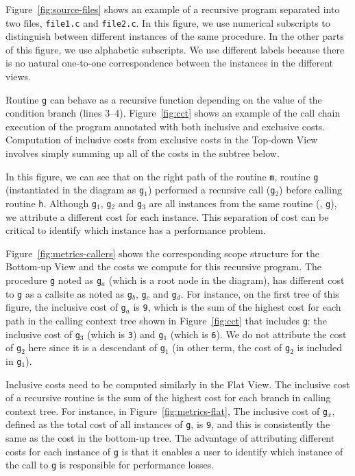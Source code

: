 Figure~\ref{fig:source-files} shows an example of a recursive program separated into two files, \texttt{file1.c} and \texttt{file2.c}.
In this figure, we use numerical subscripts to distinguish between different instances of the same procedure.
In the other parts of this figure, we use alphabetic subscripts.
We use different labels because there is no natural one-to-one correspondence between the instances in the different views.

Routine \texttt{g} can behave as a recursive function depending on the value of the condition branch (lines 3--4).
Figure~\ref{fig:cct} shows an example of the call chain execution of the program annotated with both inclusive and exclusive costs.
Computation of inclusive costs from exclusive costs in the Top-down View involves simply summing up all of the costs in the subtree below.

In this figure, we can see that on the right path of the routine \texttt{m}, routine \texttt{g} (instantiated in the diagram as \texttt{g$_1$}) performed a recursive call (\texttt{g$_2$}) before calling routine \texttt{h}.
Although \texttt{g$_1$}, \texttt{g$_2$} and \texttt{g$_3$} are all instances from the same routine (\ie{}, \texttt{g}), we attribute a different cost for each instance.
This separation of cost can be critical to identify which instance has a performance problem.

Figure~\ref{fig:metrics-callers} shows the corresponding scope structure for the Bottom-up View and the costs we compute for this recursive program.
The procedure \texttt{g} noted as \texttt{g$_a$} (which is a root node in the diagram), has different cost to \texttt{g} as a callsite as noted as \texttt{g$_b$}, \texttt{g$_c$} and \texttt{g$_d$}.
For instance, on the first tree of this figure, the inclusive cost of \texttt{g$_a$} is \texttt{9}, which is the sum of the highest cost for each path in the calling context tree shown in Figure~\ref{fig:cct} that includes \texttt{g}: the inclusive cost of \texttt{g$_3$} (which is \texttt{3}) and \texttt{g$_1$} (which is \texttt{6}).
We do not attribute the cost of \texttt{g$_2$} here since it is a descendant of \texttt{g$_1$} (in other term, the cost of \texttt{g$_2$} is included in \texttt{g$_1$}).

Inclusive costs need to be computed similarly in the Flat View.
The inclusive cost of a recursive routine is the sum of the highest cost for each branch in calling context tree.
For instance, in Figure~\ref{fig:metrics-flat}, The inclusive cost of \texttt{g$_x$}, defined as the total cost of all instances of \texttt{g}, is \texttt{9}, and this is consistently the same as the cost in the bottom-up tree.
The advantage of attributing different costs for each instance of \texttt{g} is that it enables a user to identify which instance of the call to \texttt{g} is responsible for performance losses.


